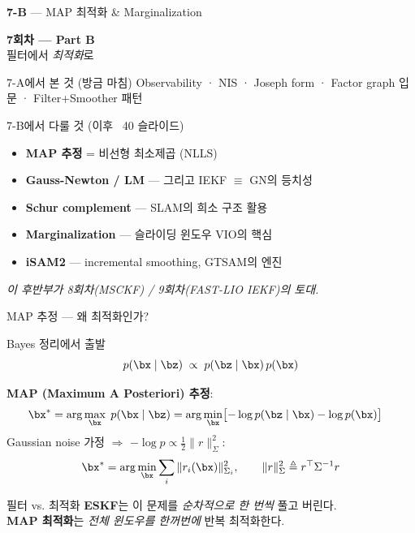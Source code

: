 \begin{frame}{\textbf{7-B} — MAP 최적화 \& Marginalization}
  \vspace{0.6em}
  \begin{center}
    {\Large\bfseries 7회차 — Part B}\\[0.4em]
    {\large 필터에서 \emph{최적화}로}
  \end{center}
  \vspace{0.4em}
  \begin{block}{\small 7-A에서 본 것 (방금 마침)}
    Observability · NIS · Joseph form · Factor graph 입문 · Filter+Smoother 패턴
  \end{block}
  \begin{exampleblock}{\small 7-B에서 다룰 것 (이후 ~40 슬라이드)}
    \begin{itemize}
      \item \textbf{MAP 추정} = 비선형 최소제곱 (NLLS)
      \item \textbf{Gauss-Newton / LM} — 그리고 \alert{IEKF $\equiv$ GN의 등치성}
      \item \textbf{Schur complement} — SLAM의 희소 구조 활용
      \item \textbf{Marginalization} — 슬라이딩 윈도우 VIO의 핵심
      \item \textbf{iSAM2} — incremental smoothing, GTSAM의 엔진
    \end{itemize}
  \end{exampleblock}
  \begin{center}\small\itshape\color{gray}
    이 후반부가 8회차(MSCKF) / 9회차(FAST-LIO IEKF)의 토대.
  \end{center}
\end{frame}


\begin{frame}{MAP 추정 — 왜 최적화인가?}
  \begin{block}{Bayes 정리에서 출발}
    \[
      p(\bx \mid \bz) \;\propto\; p(\bz \mid \bx)\,p(\bx)
    \]
  \end{block}
  \pause
  \vspace{0.3em}
  \textbf{MAP (Maximum A Posteriori) 추정}:
  \begin{align*}
    \bx^* &= \arg\max_{\bx}\; p(\bx \mid \bz)
           = \arg\min_{\bx}\bigl[-\log p(\bz \mid \bx) - \log p(\bx)\bigr]
  \end{align*}
  \pause
  Gaussian noise 가정 $\Rightarrow$ $-\log p \propto \frac{1}{2}\|r\|_{\Sigma}^2$:
  \[
    \bx^* = \arg\min_{\bx} \sum_i \|r_i(\bx)\|_{\Sigma_i}^2,
    \qquad \|r\|_{\Sigma}^2 \triangleq r^\top \Sigma^{-1} r
  \]
  \pause
  \begin{alertblock}{필터 vs. 최적화}
    \textbf{ESKF}는 이 문제를 \emph{순차적으로 한 번씩} 풀고 버린다.\\
    \textbf{MAP 최적화}는 \emph{전체 윈도우를 한꺼번에} 반복 최적화한다.
  \end{alertblock}
\end{frame}

